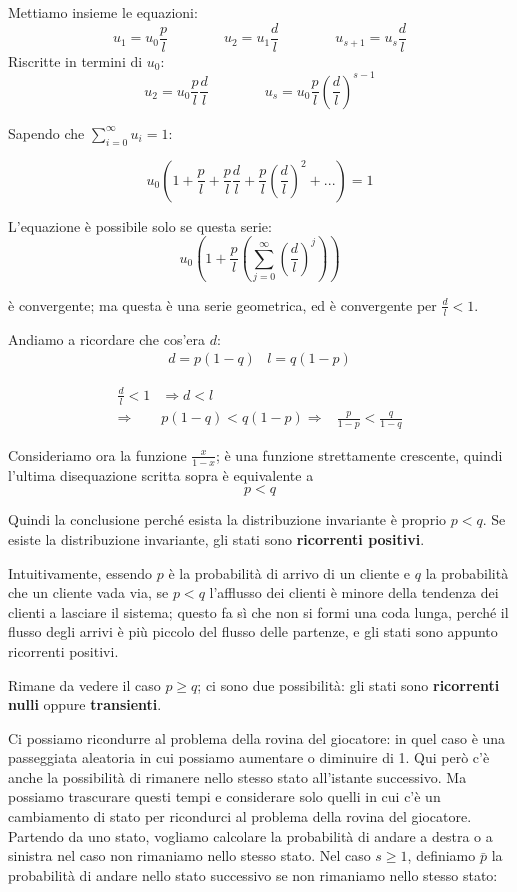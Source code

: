 \documentclass[a4paper,12pt]{book}
\begin{document}
Mettiamo insieme le equazioni:
$$ u_1 = u_0 \frac{p}{l} \qquad \qquad u_2 = u_1\frac{d}{l} \qquad \qquad u_{s+1} = u_s \frac{d}{l} $$
Riscritte in termini di $ u_0 $:
$$ u_2 = u_0 \frac{p}{l}\frac{d}{l} \qquad \qquad u_s = u_0 \frac{p}{l} \left(\frac{d}{l}\right)^{s-1} $$

Sapendo che $ \sum_{i=0}^{\infty} u_i = 1 $:

$$ u_0 \left( 1 + \frac{p}{l} + \frac{p}{l}\frac{d}{l} + \frac{p}{l} \left(\frac{d}{l}\right)^2 + ... \right) = 1 $$



L'equazione è possibile solo se questa serie:
$$ u_0 \left(1 + \frac{p}{l} \left( \sum_{j=0}^{\infty} \left(\frac{d}{l}\right)^j\right)\right) $$

è convergente; ma questa è una serie geometrica, ed è convergente per $ \frac{d}{l} < 1 $.

Andiamo a ricordare che cos'era $ d $:
$$ \begin{array}{cc}
d = p(1-q) & l = q(1-p) \end{array} $$

\begin{align}
	\frac{d}{l} < 1 & \Rightarrow d < l \\
	\Rightarrow & p(1-q) < q(1-p)
	\Rightarrow &	\frac{p}{1-p} < \frac{q}{1-q} %
\end{align}

Consideriamo ora la funzione $ \frac{x}{1-x} $; è una funzione strettamente crescente, quindi l'ultima disequazione scritta sopra è equivalente a
$$ p < q $$

Quindi la conclusione perché esista la distribuzione invariante è proprio $ p < q $. Se esiste la distribuzione invariante, gli stati sono \textbf{ricorrenti positivi}. 


Intuitivamente, essendo $ p $ è la probabilità di arrivo di un cliente e $ q $ la probabilità che un cliente vada via, se $ p < q $ l'afflusso dei clienti è minore della tendenza dei clienti a lasciare il sistema; questo fa sì che non si formi una coda lunga, perché il flusso degli arrivi è più piccolo del flusso delle partenze, e gli stati sono appunto ricorrenti positivi. 

Rimane da vedere il caso $ p \ge q $; ci sono due possibilità: gli stati sono \textbf{ricorrenti nulli} oppure \textbf{transienti}. 

Ci possiamo ricondurre al problema della rovina del giocatore: in quel caso è una passeggiata aleatoria in cui possiamo aumentare o diminuire di 1. Qui però c'è anche la possibilità di rimanere nello stesso stato all'istante successivo. 
Ma possiamo trascurare questi tempi e considerare solo quelli in cui c'è un cambiamento di stato per ricondurci al problema della rovina del giocatore. Partendo da uno stato, vogliamo calcolare la probabilità di andare a destra o a sinistra nel caso non rimaniamo nello stesso stato. Nel caso $ s \ge 1 $, definiamo $ \bar{p} $ la probabilità di andare nello stato successivo se non rimaniamo nello stesso stato:
\end{document}
